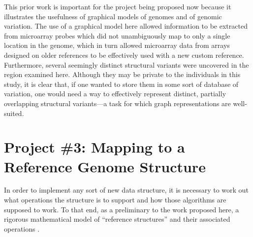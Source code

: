 \documentclass[11pt,proposal]{ucthesis}
\begin{document}
This prior work is important for the project being proposed now because it illustrates the usefulness of graphical models of genomes and of genomic variation. The use of a graphical model here allowed information to be extracted from microarray probes which did not unambiguously map to only a single location in the genome, which in turn allowed microarray data from arrays designed on older references to be effectively used with a new custom reference. Furthermore, several seemingly distinct structural variants were uncovered in the region examined here. Although they may be private to the individuals in this study, it is clear that, if one wanted to store them in some sort of database of variation, one would need a way to effectively represent distinct, partially overlapping structural variants---a task for which graph representations are well-suited.



    
    
        
    


\section{Project \#3: Mapping to a Reference Genome Structure}

In order to implement any sort of new data structure, it is necessary to work out what operations the structure is to support and how those algorithms are supposed to work. To that end, as a preliminary to the work proposed here, a rigorous mathematical model of ``reference structures'' and their associated operations \cite{paten2014mapping}. 


\end{document}
